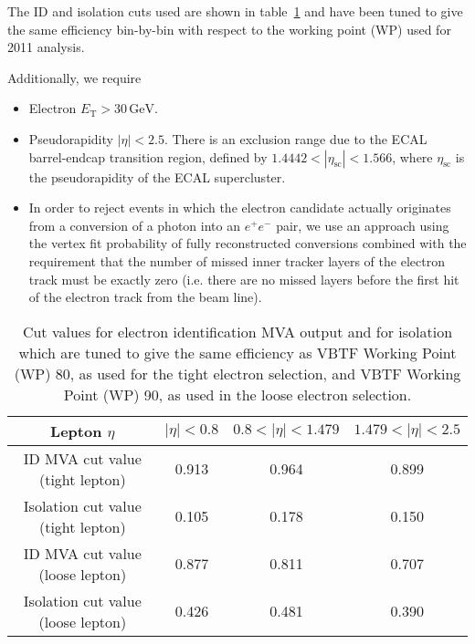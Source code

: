 The ID and isolation cuts used are shown in table~\ref{tab:EleID} and
have been tuned to give the same efficiency bin-by-bin with respect to
the working point (WP) used for 2011 analysis.

Additionally, we require
\begin{itemize}
\item Electron $E_\mathrm{T} > 30\,\mathrm{GeV}$.
\item Pseudorapidity $|\eta| < 2.5$. There is an exclusion range due
        to the ECAL barrel-endcap transition region, defined by
        $1.4442 < |\eta_{\mathrm{sc}}| < 1.566$, where
        $\eta_{\mathrm{sc}}$ is the pseudorapidity of the ECAL
        supercluster.


\item 
In order to reject events in which the electron candidate actually
originates from a conversion of a photon into an $e^{+}e^{-}$ pair, we
use an approach using the vertex fit probability of fully
reconstructed conversions combined with the requirement that the
number of missed inner tracker layers of the electron track must be
exactly zero (i.e. there are no missed layers before the first hit of
the electron track from the beam line). 
\end{itemize}
\begin{table}[bthp]
\begin{center}
{\footnotesize
\begin{tabular}{|c|c|c|c|}
\hline
Lepton $\eta$ & $|\eta| < 0.8$ & $0.8 < |\eta| < 1.479$ & $1.479 < |\eta| < 2.5$  \\
\hline
ID MVA cut value (tight lepton) & 0.913 & 0.964 & 0.899 \\
Isolation cut value (tight lepton) & 0.105 & 0.178 & 0.150 \\
ID MVA cut value (loose lepton) & 0.877 & 0.811 & 0.707 \\
Isolation cut value (loose lepton) & 0.426 & 0.481 & 0.390 \\
\hline
\end{tabular}
\caption[.]{\label{tab:EleID} Cut values for electron identification
MVA output and for isolation which are tuned to give the same
efficiency as VBTF Working Point (WP) 80, as used for the tight
electron selection, and VBTF Working Point (WP) 90, as used in the
loose electron selection.}}
\end{center}
\end{table}
